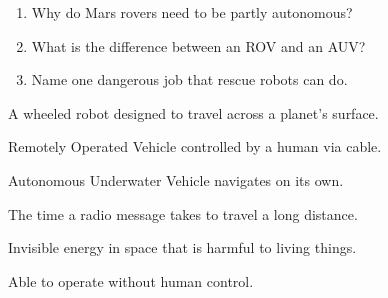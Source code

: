 \begin{quickcheck}
  \begin{enumerate}
    \item Why do Mars rovers need to be partly autonomous?
    \item What is the difference between an ROV and an AUV?
    \item Name one dangerous job that rescue robots can do.
  \end{enumerate}
\end{quickcheck}

\sectionrule
\begin{newwords}
  \begin{description}[labelwidth=3.8cm, leftmargin=4.0cm]
    \item[Rover] A wheeled robot designed to travel across a planet's surface.
    \item[ROV] Remotely Operated Vehicle \textemdash{} controlled by a human via cable.
    \item[AUV] Autonomous Underwater Vehicle \textemdash{} navigates on its own.
    \item[Signal delay] The time a radio message takes to travel a long distance.
    \item[Radiation] Invisible energy in space that is harmful to living things.
    \item[Autonomous] Able to operate without human control.
  \end{description}
\end{newwords}
